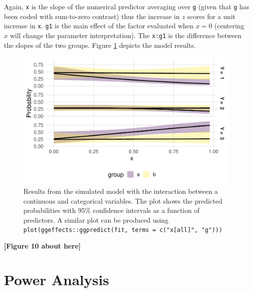 \documentclass[
  man,floatsintext]{apa6}
\begin{document}
\normalsize

Again, \texttt{x} is the slope of the numerical predictor averaging over \texttt{g} (given that \texttt{g} has been coded with sum-to-zero contrast) thus the increase in \(z\) scores for a unit increase in \texttt{x}. \texttt{g1} is the main effect of the factor evaluated when \(x = 0\) (centering \(x\) will change the parameter interpretation). The \texttt{x:g1} is the difference between the slopes of the two groups. Figure \ref{fig:fig-effects-num-by-cat-interaction} depicts the model results.

\scriptsize

\begin{figure}

{\centering \includegraphics[width=1\linewidth]{paper_files/figure-latex/fig-effects-num-by-cat-interaction-1} 

}

\caption{Results from the simulated model with the interaction between a continuous and categorical variables. The plot shows the predicted probabilities with 95\% confidence intervals as a function of predictors. A similar plot can be produced using \texttt{plot(ggeffects::ggpredict(fit,\ terms\ =\ c("x{[}all{]}",\ "g")))}}\label{fig:fig-effects-num-by-cat-interaction}
\end{figure}

\begin{center}\textbf{[Figure 10 about here]} \end{center}

\normalsize

\section{Power Analysis}\label{power-analysis}
\end{document}
